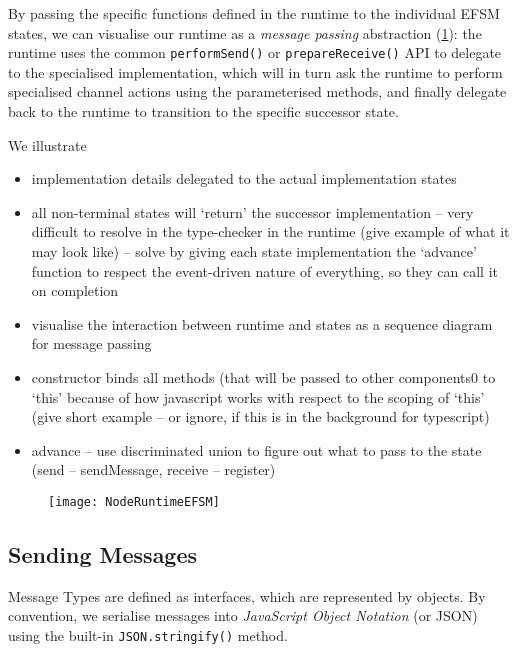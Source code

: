 By passing the specific functions defined in the runtime
to the individual EFSM states, we can visualise our runtime
as a \textit{message passing} abstraction 
(\cref{fig:noderuntimeefsm}): the runtime uses the common
\texttt{performSend()} or \texttt{prepareReceive()} API
to delegate to the specialised implementation, which will in turn
ask the runtime to perform specialised channel actions using
the parameterised methods, and finally delegate back to
the runtime to transition to the specific successor state.

We illustrate 

\begin{itemize}
\item implementation details delegated to the actual implementation states
\item all non-terminal states will `return' the successor implementation -- very difficult to resolve in the type-checker in the runtime (give example of what it may look like) -- solve by giving each state implementation the `advance' function to respect the event-driven nature of everything, so they can call it on completion
\item visualise the interaction between runtime and states as a sequence diagram for message passing
\item constructor binds all methods (that will be passed to other components0 to `this' because of how javascript works with respect to the scoping of `this' (give short example -- or ignore, if this is in the background for typescript)
\item advance -- use discriminated union to figure out what to pass to the state (send -- sendMessage, receive -- register)
\end{itemize}

\begin{figure}[!ht]
\centering
\texttt{[image: NodeRuntimeEFSM]}
\label{fig:noderuntimeefsm}
\end{figure}

\subsection{Sending Messages}
Message Types are defined as interfaces, which
are represented by objects. By convention,
we serialise messages into \textit{JavaScript Object Notation}
(or JSON) \cite{json} using the built-in \texttt{JSON.stringify()}
method.

